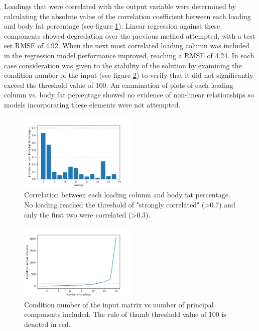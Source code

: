 \documentclass{IEEEtran}
\begin{document}
Loadings that were correlated with the output variable were determined by calculating the absolute value of the correlation coefficient between each loading and body fat percentage (see figure \ref{fig:pca_correlation}). Linear regression against these components showed degredation over the previous method attempted, with a test set RMSE of \num{4.92}. When the next most correlated loading column was included in the regression model performance improved, reaching a RMSE of \num{4.24}. In each case consideration was given to the stability of the solution by examining the condition number of the input (see figure \ref{fig:condition_number}) to verify that it did not significantly exceed the threshold value of 100. An examination of plots of each loading column vs. body fat percentage showed no evidence of non-linear relationships so models incorporating these elements were not attempted.

\begin{centering}
\begin{figure}
\centering
\begin{center}
	\includegraphics[width=0.5\textwidth]{pca_correlation}
	\caption{Correlation between each loading column and body fat percentage. No loading reached the threshold of "strongly correlated" (\textgreater0.7) and only the first two were correlated (\textgreater0.3).\label{fig:pca_correlation}}
\end{center}
\end{figure}
\end{centering}

\begin{centering}
\begin{figure}
\centering
\begin{center}
	\includegraphics[width=0.5\textwidth]{condition_number}
	\caption{Condition number of the input matrix vs number of principal components included. The rule of thumb threshold value of 100 is denoted in red.\label{fig:condition_number}}
\end{center}
\end{figure}
\end{centering}
\end{document}
